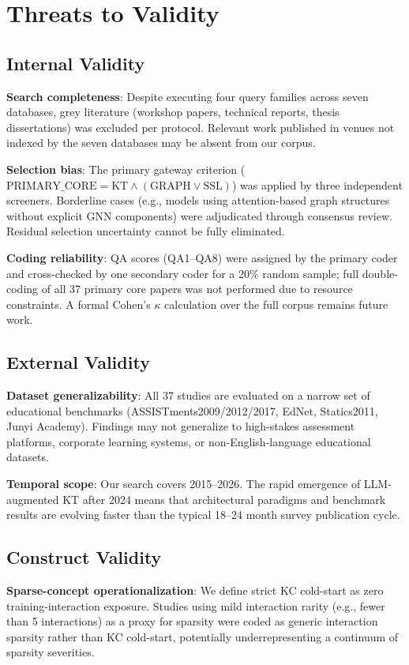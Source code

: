 ﻿\documentclass[10pt,journal,compsoc]{IEEEtran}
\begin{document}
\section{Threats to Validity}

\subsection{Internal Validity}
\textbf{Search completeness}: Despite executing four query families across seven databases, grey literature (workshop papers, technical reports, thesis dissertations) was excluded per protocol. Relevant work published in venues not indexed by the seven databases may be absent from our corpus.

\textbf{Selection bias}: The primary gateway criterion ($\text{PRIMARY\_CORE} = \text{KT} \land (\text{GRAPH} \lor \text{SSL})$) was applied by three independent screeners. Borderline cases (e.g., models using attention-based graph structures without explicit GNN components) were adjudicated through consensus review. Residual selection uncertainty cannot be fully eliminated.

\textbf{Coding reliability}: QA scores (QA1--QA8) were assigned by the primary coder and cross-checked by one secondary coder for a 20\% random sample; full double-coding of all 37 primary core papers was not performed due to resource constraints. A formal Cohen's $\kappa$ calculation over the full corpus remains future work.

\subsection{External Validity}
\textbf{Dataset generalizability}: All 37 studies are evaluated on a narrow set of educational benchmarks (ASSISTments2009/2012/2017, EdNet, Statics2011, Junyi Academy). Findings may not generalize to high-stakes assessment platforms, corporate learning systems, or non-English-language educational datasets.

\textbf{Temporal scope}: Our search covers 2015--2026. The rapid emergence of LLM-augmented KT after 2024 means that architectural paradigms and benchmark results are evolving faster than the typical 18--24 month survey publication cycle.

\subsection{Construct Validity}
\textbf{Sparse-concept operationalization}: We define strict KC cold-start as zero training-interaction exposure. Studies using mild interaction rarity (e.g., fewer than 5 interactions) as a proxy for sparsity were coded as generic interaction sparsity rather than KC cold-start, potentially underrepresenting a continuum of sparsity severities.
\end{document}
